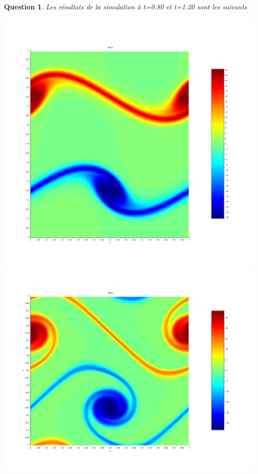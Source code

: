 \documentclass[a4paper,10pt]{article}
\newtheorem{question}{Question}
\begin{document}
\begin{question}
Les résultats de la simulation à t=0.80 et t=1.20
sont les suivants
\begin{center}
\includegraphics[scale=0.15]{isocontours_0,800000.png}
\label{fig1}
\includegraphics[scale=0.2]{isocontours_1,200000.png}
\label{fig1}
\end{center}

\end{question}
\end{document}
